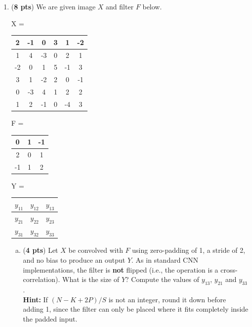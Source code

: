 \documentclass[11pt]{exam}
\begin{document}
\begin{enumerate}[1.]
\item ({\bf 8 pts}) We are given image $X$ and filter $F$ below.\\
\begin{center}
    X = \begin{tabular}{|*{6}{c|}}
\hline
2 & -1 & 0 & 3 & 1 & -2 \\
\hline
1 & 4 & -3 & 0 & 2 & 1 \\
\hline
-2 & 0 & 1 & 5 & -1 & 3 \\
\hline
3 & 1 & -2 & 2 & 0 & -1 \\
\hline
0 & -3 & 4 & 1 & 2 & 2 \\
\hline
1 & 2 & -1 & 0 & -4 & 3 \\
\hline
\end{tabular}
F = \begin{tabular}{|c|c|c|}
\hline
0 & 1 & -1 \\
\hline
2 & 0 & 1 \\
\hline
-1 & 1 & 2 \\
\hline
\end{tabular}
Y = \begin{tabular}{|c|c|c|}
\hline
$y_{11}$ & $y_{12}$ & $y_{13}$ \\
\hline
$y_{21}$ & $y_{22}$ & $y_{23}$ \\
\hline
$y_{31}$ & $y_{32}$ & $y_{33}$ \\
\hline
\end{tabular}
\end{center}
	
\begin{enumerate}[(a)]
\item ({\bf 4 pts}) Let $X$ be convolved with $F$ using zero-padding of 1, a stride of 2, and no bias to produce an output $Y$. As in standard CNN implementations, the filter is {\bf not} flipped (i.e., the operation is a cross-correlation). What is the size of $Y$? Compute the values of $y_{13}$, $y_{21}$ and $y_{33}$.\\
{\bf Hint:} If $(N - K + 2P)/S$ is not an integer, round it down before adding 1, since the filter can only be placed where it fits completely inside the padded input.\\
\begin{tcolorbox}
\vspace{70ex}
\end{tcolorbox}
        


\end{enumerate}
\end{enumerate}
\end{document}
